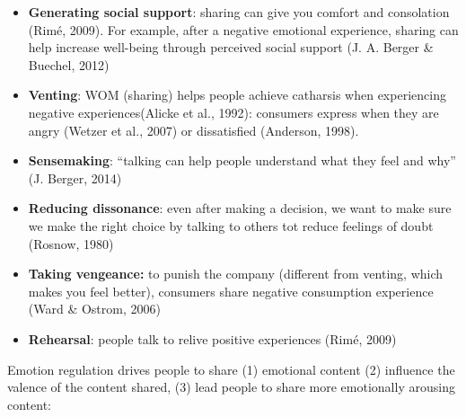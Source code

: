 \documentclass[
]{book}
\providecommand{\tightlist}{%
  \setlength{\itemsep}{0pt}\setlength{\parskip}{0pt}}
\begin{document}
\begin{itemize}
\tightlist
\item
  \textbf{Generating social support}: sharing can give you comfort and consolation (Rimé, 2009). For example, after a negative emotional experience, sharing can help increase well-being through perceived social support (J. A. Berger \& Buechel, 2012)\\
\item
  \textbf{Venting}: WOM (sharing) helps people achieve catharsis when experiencing negative experiences(Alicke et al., 1992): consumers express when they are angry (Wetzer et al., 2007) or dissatisfied (Anderson, 1998).\\
\item
  \textbf{Sensemaking}: ``talking can help people understand what they feel and why'' (J. Berger, 2014)\\
\item
  \textbf{Reducing dissonance}: even after making a decision, we want to make sure we make the right choice by talking to others tot reduce feelings of doubt (Rosnow, 1980)\\
\item
  \textbf{Taking vengeance:} to punish the company (different from venting, which makes you feel better), consumers share negative consumption experience (Ward \& Ostrom, 2006)\\
\item
  \textbf{Rehearsal}: people talk to relive positive experiences (Rimé, 2009)
\end{itemize}

Emotion regulation drives people to share (1) emotional content (2) influence the valence of the content shared, (3) lead people to share more emotionally arousing content:
\end{document}
